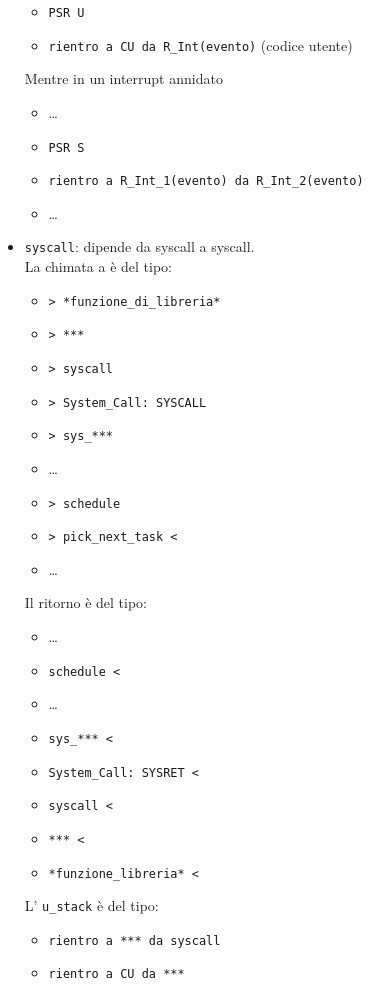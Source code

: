 \documentclass[12pt, a4paper]{report}
\begin{document}
\begin{itemize}
\begin{itemize}
		      \item \texttt{PSR U}
		      \item \texttt{rientro a CU da R\_Int(evento)} (codice utente)
	      \end{itemize}
	      Mentre in un interrupt annidato
	      \begin{itemize}
		      \item \dots
		      \item \texttt{PSR S}
		      \item \texttt{rientro a R\_Int\_1(evento) da R\_Int\_2(evento)}
		      \item \dots
	      \end{itemize}
	\item \texttt{syscall}: dipende da syscall a syscall.\\
	      La chimata a è del tipo:
	      \begin{itemize}
		      \item \texttt{> *funzione\_di\_libreria*}
		      \item \texttt{> ***}
		      \item \texttt{> syscall}
		      \item \texttt{> System\_Call: SYSCALL}
		      \item \texttt{> sys\_***}
		      \item \dots
		      \item \texttt{> schedule}
		      \item \texttt{> pick\_next\_task <}
		      \item \dots
	      \end{itemize}
	      Il ritorno è del tipo:
	      \begin{itemize}
		      \item \dots
		      \item \texttt{schedule <}
		      \item \dots
		      \item \texttt{sys\_*** <}
		      \item \texttt{System\_Call: SYSRET <}
		      \item \texttt{syscall <}
		      \item \texttt{*** <}
		      \item \texttt{*funzione\_libreria* <}
	      \end{itemize}
	      L' \texttt{u\_stack} è del tipo:
	      \begin{itemize}
		      \item \texttt{rientro a *** da syscall}
		      \item \texttt{rientro a CU da ***}

\end{itemize}
\end{itemize}
\end{document}
